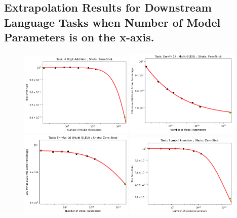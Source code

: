 \documentclass{article} %
\begin{document}
\fi

\clearpage

\subsection{Extrapolation Results for Downstream Language Tasks when Number of Model Parameters is on the x-axis.}
\label{section:language_tasks__number_of_parameters}

\begin{figure}[htbp]
    \centering
\includegraphics[width=0.48\textwidth]{figures/gpt-3__parameter_scaling/4D+___Zero-Shot.png}
\includegraphics[width=0.48\textwidth]{figures/gpt-3__parameter_scaling/En_to_Fr_14__Multi-BLEU____Few-Shot.png}
\includegraphics[width=0.48\textwidth]{figures/gpt-3__parameter_scaling/En_to_Ro_16__Multi-BLEU____Zero-Shot.png}
\includegraphics[width=0.48\textwidth]{figures/gpt-3__parameter_scaling/Symbol_Insertion___Zero-Shot.png}

\end{figure}
\end{document}

